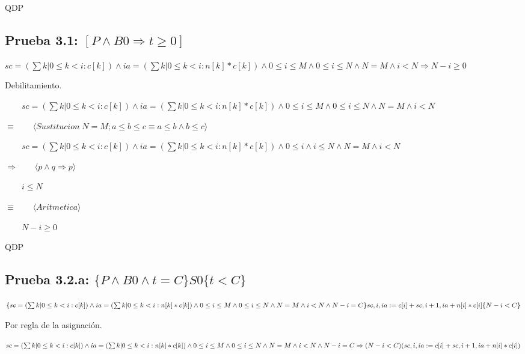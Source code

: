 \documentclass{article}
\begin{document}
QDP

\newpage


\subsection*{Prueba 3.1: $[P \land B0 \Rightarrow t \geq 0]$}

$sc=(\sum k|0 \leq k < i: c[k]) \land ia=(\sum k|0 \leq k < i: n[k]*c[k]) \land 0 \leq i \leq M \land 0 \leq i \leq N \land N=M \land i < N \Rightarrow N-i \geq 0 $ \par 

Debilitamiento. \par 

$\qquad sc=(\sum k|0 \leq k < i: c[k]) \land ia=(\sum k|0 \leq k < i: n[k]*c[k]) \land 0 \leq i \leq M \land 0 \leq i \leq N \land N=M \land i < N $ \par 
$\equiv  \qquad \langle Sustitucion \; N=M; a \leq b \leq c \equiv a \leq b \land b \leq c \rangle$ \par 
$\qquad sc=(\sum k|0 \leq k < i: c[k]) \land ia=(\sum k|0 \leq k < i: n[k]*c[k]) \land 0 \leq i \land i \leq N \land N=M \land i < N $ \par 
$\Rightarrow  \qquad \langle p \land q \Rightarrow p \rangle$ \par 
$\qquad i \leq N $ \par 
$\equiv  \qquad \langle Aritmetica \rangle$ \par 
$\qquad N - i \geq 0 $ \par 

QDP


\newpage

\subsection*{Prueba 3.2.a: $\{P \land B0 \land t = C\} S0 \{t < C\}$}

$\{sc=(\sum k|0 \leq k < i: c[k]) \land ia=(\sum k|0 \leq k < i: n[k]*c[k]) \land 0 \leq i \leq M \land 0 \leq i \leq N \land N=M \land i < N \land N-i = C\} \\
sc, i, ia := c[i]+sc, i + 1, ia+n[i]*c[i]\\
\{N-i<C\} $ \par 

Por regla de la asignación. \par 

$sc=(\sum k|0 \leq k < i: c[k]) \land ia=(\sum k|0 \leq k < i: n[k]*c[k]) \land 0 \leq i \leq M \land 0 \leq i \leq N \land N=M \land i < N \land N-i = C \Rightarrow \\
(N-i<C)(sc, i, ia := c[i]+sc, i + 1, ia+n[i]*c[i]) $ \par 
\end{document}
